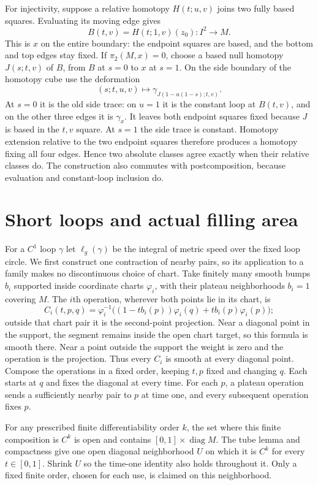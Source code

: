 For injectivity, suppose a relative homotopy $H(t;u,v)$ joins two fully
based squares. Evaluating its moving edge gives
\[
 B(t,v)=H(t;1,v)(z_0):I^2\longrightarrow M.
\]
This is $x$ on the entire boundary: the endpoint squares are based,
and the bottom and top edges stay fixed. If $\pi_2(M,x)=0$, choose a
based null homotopy $J(s;t,v)$ of $B$, from $B$ at $s=0$ to $x$ at
$s=1$. On the side boundary of the homotopy cube use the deformation
\[
 (s;t,u,v)\longmapsto\gamma_{J(1-u(1-s);t,v)}.
\]
At $s=0$ it is the old side trace: on $u=1$ it is the constant loop at
$B(t,v)$, and on the other three edges it is $\gamma_x$. It leaves both
endpoint squares fixed because $J$ is based in the $t,v$ square. At
$s=1$ the side trace is constant. Homotopy extension relative to the
two endpoint squares therefore produces a homotopy fixing all four
edges. Hence two absolute classes agree exactly when their relative
classes do. The construction also commutes with postcomposition,
because evaluation and constant-loop inclusion do.

\section{Short loops and actual filling area}
\label{sec:filling-short-loops}

For a $C^1$ loop $\gamma$ let $\ell_g(\gamma)$ be the integral of metric speed over the
fixed loop circle. We first construct one contraction of nearby pairs,
so its application to a family makes no discontinuous choice of chart.
Take finitely many smooth bumps $b_i$ supported inside coordinate charts
$\varphi_i$, with their plateau neighborhoods $b_i=1$ covering $M$.
The $i$th operation, wherever both points lie in its chart, is
\[
 C_i(t,p,q)=\varphi_i^{-1}
 \bigl((1-tb_i(p))\varphi_i(q)+tb_i(p)\varphi_i(p)\bigr);
\]
outside that chart pair it is the second-point projection. Near a
diagonal point in the support, the segment remains inside the open
chart target, so this formula is smooth there. Near a point outside
the support the weight is zero and the operation is the projection.
Thus every $C_i$ is smooth at every diagonal point. Compose the
operations in a fixed order, keeping $t,p$ fixed and changing $q$.
Each starts at $q$ and fixes the diagonal at every time. For each $p$,
a plateau operation sends a sufficiently nearby pair to $p$ at time
one, and every subsequent operation fixes $p$.

For any prescribed finite differentiability order $k$, the set where
this finite composition is $C^k$ is open and contains
$[0,1]\times\operatorname{diag}M$. The tube lemma and compactness
give one open diagonal neighborhood $U$ on which it is $C^k$ for
every $t\in[0,1]$. Shrink $U$ so the time-one identity also holds
throughout it. Only a fixed finite order, chosen for each use, is
claimed on this neighborhood.

